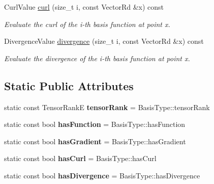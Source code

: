 \begin{DoxyCompactItemize}
Curl\+Value \hyperlink{classHArDCore3D_1_1RestrictedBasis_a6886d8130d38f8e0cdeac3c53fe9e177}{curl} (size\+\_\+t i, const Vector\+Rd \&x) const
\begin{DoxyCompactList}\small\item\em Evaluate the curl of the i-\/th basis function at point x. \end{DoxyCompactList}\item 
\mbox{\label{classHArDCore3D_1_1RestrictedBasis_a06c5ecd7cb9ce4c52891c355a5dc2108}} 
Divergence\+Value \hyperlink{classHArDCore3D_1_1RestrictedBasis_a06c5ecd7cb9ce4c52891c355a5dc2108}{divergence} (size\+\_\+t i, const Vector\+Rd \&x) const
\begin{DoxyCompactList}\small\item\em Evaluate the divergence of the i-\/th basis function at point x. \end{DoxyCompactList}\end{DoxyCompactItemize}
\subsection*{Static Public Attributes}
\begin{DoxyCompactItemize}
\item 
\mbox{\label{classHArDCore3D_1_1RestrictedBasis_a3ddf18de758627911fa464fc589f7efa}} 
static const Tensor\+RankE {\bfseries tensor\+Rank} = Basis\+Type\+::tensor\+Rank
\item 
\mbox{\label{classHArDCore3D_1_1RestrictedBasis_ac69eacd2dade777041c3320d4b830131}} 
static const bool {\bfseries has\+Function} = Basis\+Type\+::has\+Function
\item 
\mbox{\label{classHArDCore3D_1_1RestrictedBasis_a6674593e65b0d4b08fec501f5f8030c9}} 
static const bool {\bfseries has\+Gradient} = Basis\+Type\+::has\+Gradient
\item 
\mbox{\label{classHArDCore3D_1_1RestrictedBasis_ac2fb5928f5487a216fd108f333790461}} 
static const bool {\bfseries has\+Curl} = Basis\+Type\+::has\+Curl
\item 
\mbox{\label{classHArDCore3D_1_1RestrictedBasis_af5b965b1943c028721975f8044ec9b87}} 
static const bool {\bfseries has\+Divergence} = Basis\+Type\+::has\+Divergence
\end{DoxyCompactItemize}


